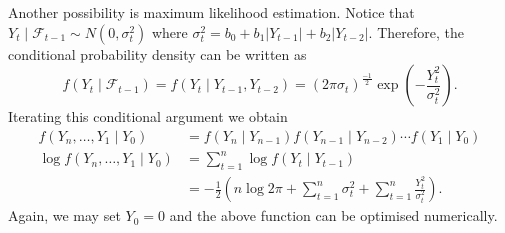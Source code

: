\documentclass{article}
\theoremstyle{plain}
\theoremstyle{definition}
\newenvironment{sol}{\begin{trivlist}
 \item[\hskip \labelsep {\textit{Solution}.}\hskip \labelsep]}{\end{trivlist}}
\begin{document}
\begin{sol}
Another possibility is maximum likelihood estimation. Notice that $Y_t\mid \mathcal{F}_{t-1}\sim N(0,\sigma_t^2)$ where $\sigma_t^2 = b_0+b_1|Y_{t-1}|+b_2|Y_{t-2}|$. Therefore, the conditional probability density can be written as
\[f(Y_t\mid \mathcal{F}_{t-1})=f(Y_t\mid Y_{t-1}, Y_{t-2})=(2\pi\sigma_t)^{\frac{-1}{2}}\exp\left(-\frac{Y_t^2}{\sigma_t^2}\right).\]
Iterating this conditional argument we obtain
\begin{align*}
f(Y_n,\dots, Y_1\mid Y_0) &=f(Y_n\mid Y_{n-1})f(Y_{n-1}\mid Y_{n-2})\cdots f(Y_1\mid Y_0)\\
\log{f(Y_n,\dots, Y_1\mid Y_0)}  & =\sum_{t=1}^n \log f(Y_t\mid Y_{t-1})\\
& = -\frac{1}{2}\left(n\log{2\pi} +\sum_{t=1}^n\sigma_t^2+\sum_{t=1}^n\frac{Y_t^2}{\sigma_t^2}\right).
\end{align*}
Again, we may set $Y_0=0$ and the above function can be optimised numerically.
\end{sol}
\end{document}
